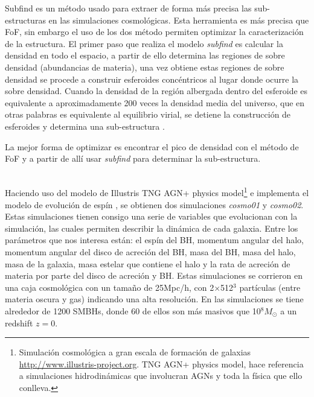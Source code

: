 Subfind es un método usado para extraer de forma más precisa las sub-estructuras en las simulaciones cosmológicas. Esta herramienta es más precisa que FoF, sin embargo el uso de los dos método permiten optimizar la caracterización de la estructura. El primer paso que realiza el modelo {\it{subfind}} es calcular la densidad en todo el espacio, a partir de ello determina las regiones de sobre densidad (abundancias de materia), una vez  obtiene estas regiones de sobre densidad se procede a construir esferoides concéntricos al lugar donde ocurre la sobre densidad. Cuando la densidad de la región albergada dentro del esferoide es equivalente a aproximadamente 200 veces la densidad media del universo, que en otras palabras es equivalente al equilibrio virial, se detiene la construcción de esferoides y determina una sub-estructura \cite{springel2018}.

La mejor forma de optimizar es encontrar el pico de densidad con el método de FoF y a partir de allí usar {\it{subfind}} para determinar la sub-estructura.

~\\

Haciendo uso del modelo de Illustris TNG AGN+ physics model\footnote{Simulación cosmológica a gran escala de formación de galaxias \url{http://www.illustris-project.org}. TNG AGN+ physics model, hace referencia a simulaciones hidrodinámicas que involucran AGNs y toda la física que ello conlleva.} e implementa el modelo de evolución de espín \cite{Bustamante2018b}, se obtienen dos simulaciones {\it{cosmo01}} y {\it{cosmo02}}. Estas simulaciones tienen consigo una serie de variables que evolucionan con la simulación, las cuales permiten describir la dinámica de cada galaxia.
Entre los parámetros que nos interesa están: el espín del BH, momentum angular del halo, momentum angular del disco de acreción del BH, masa del BH, masa del halo, masa de la galaxia, masa estelar que contiene el halo y la rata de acreción de materia por parte del disco de acreción y BH. Estas simulaciones se corrieron en una caja cosmológica con un tamaño de 25Mpc/h, con 2$\times$512$^{3}$ partículas (entre materia oscura y gas) indicando una alta resolución. En las simulaciones se tiene alrededor de 1200 SMBHs, donde 60 de ellos son más masivos que 10$^{8}M_{\odot}$ a un redshift $z=0$.

